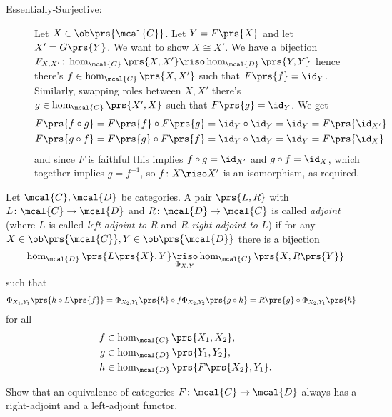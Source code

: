 \documentclass[10pt]{article}
\begin{document}
\begin{solution}
\begin{description}
\begin{description}
\item[Essentially-Surjective:]
Let $X \in \ob\prs{\mcal{C}}$. Let $Y = F\prs{X}$ and let $X' = G\prs{Y}$. We want to show $X \cong X'$.
We have a bijection $F_{X,X'} \colon \hom_{\mcal{C}}\prs{X,X'} \riso \hom_{\mcal{D}}\prs{Y,Y}$ hence there's $f \in \hom_{\mcal{C}}\prs{X,X'}$ such that $F\prs{f} = \id_Y$. Similarly, swapping roles between $X,X'$ there's $g \in \hom_{\mcal{C}}\prs{X',X}$ such that $F\prs{g} = \id_Y$. We get
\begin{align*}
F\prs{f \circ g} &= F\prs{f} \circ F\prs{g} = \id_Y \circ \id_Y = \id_Y = F\prs{\id_{X'}} \\
F\prs{g \circ f} &= F\prs{g} \circ F\prs{f} = \id_Y \circ \id_Y = \id_Y = F\prs{\id_{X}}
\end{align*}
and since $F$ is faithful this implies $f \circ g = \id_{X'}$ and $g \circ f = \id_X$, which together implies $g = f^{-1}$, so $f \colon X \riso X'$ is an isomorphism, as required.
\end{description}
\end{description}
\end{solution}

\begin{exercise}%
Let $\mcal{C}, \mcal{D}$ be categories. A pair $\prs{L,R}$ with $L \colon \mcal{C} \to \mcal{D}$ and $R \colon \mcal{D} \to \mcal{C}$ is called \emph{adjoint} (where $L$ is called \emph{left-adjoint to $R$} and $R$ \emph{right-adjoint to $L$}) if for any $X \in \ob\prs{\mcal{C}}, Y \in \ob\prs{\mcal{D}}$ there is a bijection
\[\hom_{\mcal{D}} \prs{L\prs{X}, Y} \underset{\Phi_{X,Y}}{\riso} \hom_{\mcal{C}}\prs{X, R\prs{Y}}\]
such that
\begin{align*}
\Phi_{X_1, Y_1}\prs{h \circ L\prs{f}} &= \Phi_{X_2, Y_1}\prs{h} \circ f
\Phi_{X_2, Y_2}\prs{g \circ h} = R\prs{g} \circ \Phi_{X_2, Y_1}\prs{h}
\end{align*}
for all
\begin{align*}
f &\in \hom_{\mcal{C}}\prs{X_1, X_2},\\
g &\in \hom_{\mcal{D}}\prs{Y_1, Y_2},\\
h &\in \hom_{\mcal{D}}\prs{F\prs{X_2}, Y_1} \text{.}
\end{align*}

Show that an equivalence of categories $F \colon \mcal{C} \to \mcal{D}$ always has a right-adjoint and a left-adjoint functor.
\end{exercise}
\end{document}
